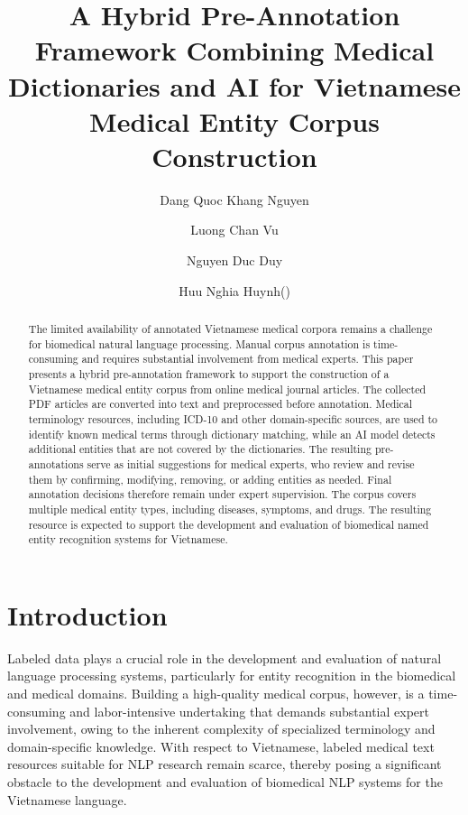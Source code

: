 \documentclass[runningheads]{llncs}
\begin{document}
\title{A Hybrid Pre-Annotation Framework Combining Medical Dictionaries and AI for Vietnamese Medical Entity Corpus Construction}

\author{
Dang Quoc Khang Nguyen \and
Luong Chan Vu \and
Nguyen Duc Duy \and
Huu Nghia Huynh(\Letter)
}



\maketitle

\begin{abstract}
The limited availability of annotated Vietnamese medical corpora remains a challenge for biomedical natural language processing. Manual corpus annotation is time-consuming and requires substantial involvement from medical experts. This paper presents a hybrid pre-annotation framework to support the construction of a Vietnamese medical entity corpus from online medical journal articles. The collected PDF articles are converted into text and preprocessed before annotation. Medical terminology resources, including ICD-10 and other domain-specific sources, are used to identify known medical terms through dictionary matching, while an AI model detects additional entities that are not covered by the dictionaries. The resulting pre-annotations serve as initial suggestions for medical experts, who review and revise them by confirming, modifying, removing, or adding entities as needed. Final annotation decisions therefore remain under expert supervision. The corpus covers multiple medical entity types, including diseases, symptoms, and drugs. The resulting resource is expected to support the development and evaluation of biomedical named entity recognition systems for Vietnamese.

\end{abstract}

\section{Introduction}
Labeled data plays a crucial role in the development and evaluation of natural language processing systems, particularly for entity recognition in the biomedical and medical domains. Building a high-quality medical corpus, however, is a time-consuming and labor-intensive undertaking that demands substantial expert involvement, owing to the inherent complexity of specialized terminology and domain-specific knowledge. With respect to Vietnamese, labeled medical text resources suitable for NLP research remain scarce, thereby posing a significant obstacle to the development and evaluation of biomedical NLP systems for the Vietnamese language.
\end{document}
